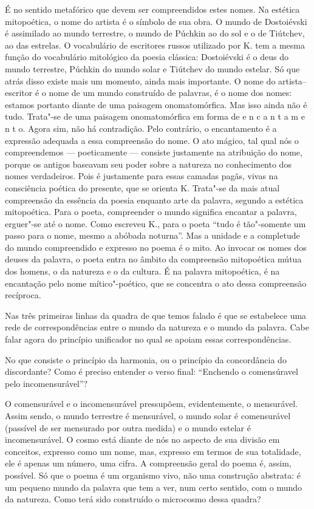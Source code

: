 É no sentido metafórico que devem ser compreendidos estes nomes. Na
estética mitopoética, o nome do artista é o símbolo de sua obra. O mundo
de Dostoiévski é assimilado ao mundo terrestre, o mundo de Púchkin ao do
sol e o de Tiútchev, ao das estrelas. O vocabulário de escritores russos
utilizado por K. tem a mesma função do vocabulário mitológico da poesia
clássica: Dostoiévski é o deus do mundo terrestre, Púchkin do mundo
solar e Tiútchev do mundo estelar. Só que atrás disso existe mais um
momento, ainda mais importante. O nome do artista--escritor é o nome de
um mundo construído de palavras, é o nome dos nomes: estamos portanto
diante de uma paisagem onomatomórfica. Mas isso ainda não é tudo.
Trata"-se de uma paisagem onomatomórfica em forma de e n c a n t a m e n
t o. Agora sim, não há contradição. Pelo contrário, o encantamento é a
expressão adequada a essa compreensão do nome. O ato mágico, tal qual
nós o compreendemos --- poeticamente --- consiste justamente na
atribuição do nome, porque os antigos baseavam seu poder sobre a
natureza no conhecimento dos nomes verdadeiros. Pois é justamente para
essas camadas pagãs, vivas na consciência poética do presente, que se
orienta K. Trata"-se da mais atual compreensão da essência da poesia
enquanto arte da palavra, segundo a estética mitopoética. Para o poeta,
compreender o mundo significa encantar a palavra, erguer"-se até o nome.
Como escreveu K., para o poeta ``tudo é tão"-somente um passo para o
nome, mesmo a abóbada noturna''. Mas a unidade e a completude do mundo
compreendido e expresso no poema é o mito. Ao invocar os nomes dos
deuses da palavra, o poeta entra no âmbito da compreensão mitopoética
mútua dos homens, o da natureza e o da cultura. É na palavra
mitopoética, é na encantação pelo nome mítico"-poético, que se concentra
o ato dessa compreensão recíproca.

Nas três primeiras linhas da quadra de que temos falado é que se
estabelece uma rede de correspondências entre o mundo da natureza e o
mundo da palavra. Cabe falar agora do princípio unificador no qual se
apoiam essas correspondências.

No que consiste o princípio da harmonia, ou o princípio da concordância
do discordante? Como é preciso entender o verso final: ``Enchendo o
comensúravel pelo incomensurável''?

O comensurável e o incomensurável pressupõem, evidentemente, o
mensurável. Assim sendo, o mundo terrestre é mensurável, o mundo solar é
comensurável (passível de ser mensurado por outra medida) e o mundo
estelar é incomensurável. O cosmo está diante de nós no aspecto de sua
divisão em conceitos, expresso como um nome, mas, expresso em termos de
sua totalidade, ele é apenas um número, uma cifra. A compreensão geral do
poema é, assim, possível. Só que o poema é um organismo vivo, não uma
construção abstrata: é um pequeno mundo da palavra que tem a ver, num
certo sentido, com o mundo da natureza. Como terá sido construído o
microcosmo dessa quadra?

